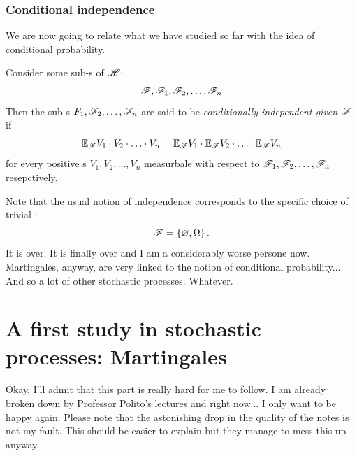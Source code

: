 \documentclass{report}
\begin{document}
\subsection{Conditional independence}
We are now going to relate what we have studied so far with the idea of conditional probability. \\
\begin{definition}
	Consider some sub-\sa s of $\mathscr{H}$:
\[\mathscr{F},\mathscr{F}_1,\mathscr{F}_2,\ldots,\mathscr{F}_n\]
Then the sub-\sa{}s $F_1,\mathscr{F}_2,\ldots,\mathscr{F}_n$ are said to be \emph{conditionally independent given $\mathscr{F}$} if
\begin{equation*}
	\mathbb{E}_{\mathscr{F}} V_1\cdot V_2\cdot\ldots\cdot V_n=\mathbb{E}_{\mathscr{F}} V_1\cdot\mathbb{E}_{\mathscr{F}} V_2\cdot\ldots\cdot\mathbb{E}_{\mathscr{F}} V_n
\end{equation*}
for every positive \rv s $V_1,V_2,\ldots,V_n$ measurbale with respect to $\mathscr{F}_1,\mathscr{F}_2,\ldots,\mathscr{F}_n$ resepctively.
\end{definition}
Note that the usual notion of independence corresponds to the specific choice of trivial \sa:
\begin{equation*}
	\mathscr{F}=\left\{\varnothing,\Omega\right\}.
\end{equation*}
It is over. It is finally over and I am a considerably worse persone now. Martingales, anyway, are very linked to the notion of conditional probability... And so a lot of other stochastic processes. Whatever.

\chapter{A first study in stochastic processes: Martingales}
Okay, I'll admit that this part is really hard for me to follow. I am already broken down by Professor Polito's lectures and right now... I only want to be happy again. Please note that the astonishing drop in the quality of the notes is not my fault. This should be easier to explain but they manage to mess this up anyway. 
\end{document}

